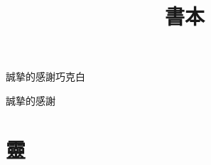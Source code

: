 \documentclass[dvipdfmx]{ujbook}
\author{}
\title{書本}
\begin{document}
\frontmatter
\maketitle
\begin{qte}\Huge
  誠摯的感謝巧克白
\end{qte}
\begin{qte}\Huge
\end{qte}
\begin{qte}\Huge
  誠摯的感謝
\end{qte}
\tableofcontents

\mainmatter
\part{}
\part{靈}

\appendix

\backmatter
\end{document}
